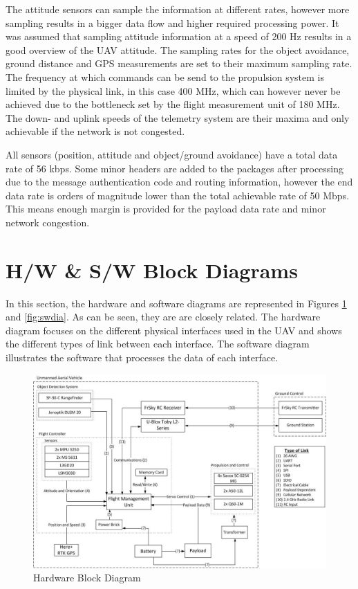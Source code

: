The attitude sensors can sample the information at different rates, however more sampling results in a bigger data flow and higher required processing power. It was assumed that sampling attitude information at a speed of 200 Hz results in a good overview of the UAV attitude. The sampling rates for the object avoidance, ground distance and GPS measurements are set to their maximum sampling rate. The frequency at which commands can be send to the propulsion system is limited by the physical link, in this case 400 MHz, which can however never be achieved due to the bottleneck set by the flight measurement unit of 180 MHz. The down- and uplink speeds of the telemetry system are their maxima and only achievable if the network is not congested. 

All sensors (position, attitude and object/ground avoidance) have a total data rate of 56 kbps. Some minor headers are added to the packages after processing due to the message authentication code and routing information, however the end data rate is orders of magnitude lower than the total achievable rate of 50 Mbps. This means enough margin is provided for the payload data rate and minor network congestion.   


\section{H/W \& S/W Block Diagrams}
\label{sec:hw_sw_bloc_diag}

In this section, the hardware and software diagrams are represented in Figures \ref{fig:hwdia} and \ref{fig:swdia}. As can be seen, they are are closely related. The hardware diagram focuses on the different physical interfaces used in the UAV and shows the different types of link between each interface. The software diagram illustrates the software that processes the data of each interface. 

\begin{figure}[h]
    \centering
    \includegraphics[width=.8\textwidth]{./CommandDataHandling/Figures/HWdiagram.jpg}
    \caption{Hardware Block Diagram}
    \label{fig:hwdia}
\end{figure}

